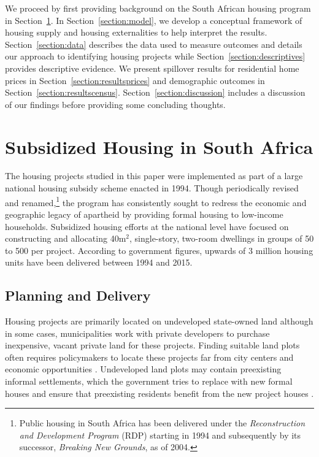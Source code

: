 \documentclass[12pt]{article}
\begin{document}
We proceed by first providing background on the South African housing program in Section~\ref{section:background}.  In Section~\ref{section:model}, we develop a conceptual framework of housing supply and housing externalities to help interpret the results. Section~\ref{section:data} describes the data used to measure outcomes and details our approach to identifying housing projects while Section~\ref{section:descriptives} provides descriptive evidence.  We present spillover results for residential home prices in Section~\ref{section:resultsprices} and demographic outcomes in Section~\ref{section:resultscensus}.  Section~\ref{section:discussion} includes a discussion of our findings before providing some concluding thoughts.


\section{Subsidized Housing in South Africa} \label{section:background}

The housing projects studied in this paper were implemented as part of a large national housing subsidy scheme enacted in 1994. Though periodically revised and renamed,\footnote{Public housing in South Africa has been delivered under the {\it Reconstruction and Development Program} (RDP) starting in 1994 and subsequently by its successor, {\it Breaking New Grounds}, as of 2004.} the program has consistently sought to redress the economic and geographic legacy of apartheid by providing formal housing to low-income households. Subsidized housing efforts at the national level have focused on constructing and allocating 40m$^2$, single-story, two-room dwellings in groups of 50 to 500 per project. According to government figures, upwards of 3 million housing units have been delivered between 1994 and 2015.

\subsection{Planning and Delivery}

Housing projects are primarily located on undeveloped state-owned land although in some cases, municipalities work with private developers to purchase inexpensive, vacant private land for these projects.  Finding suitable land plots often requires policymakers to locate these projects far from city centers and economic opportunities \citep{dhsreports}.  Undeveloped land plots may contain preexisting informal settlements, which the government tries to replace with new formal houses and ensure that preexisting residents benefit from the new project houses \citep{serihistory}.
\end{document}
